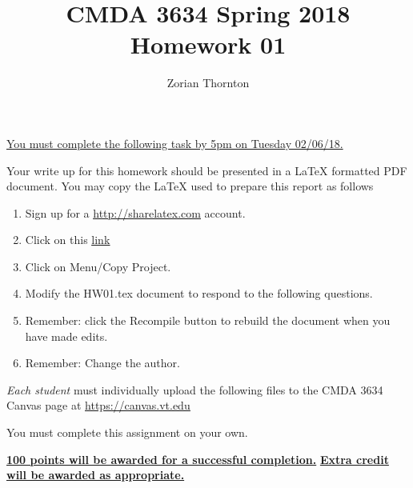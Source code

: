 \documentclass{article}
\newcommand{\pad}{\vspace{8pt}\noindent}
\newcommand{\myhref}[2]{\href{#1}{\color{foo}\underline{#2}\color{black}}}
\begin{document}
\title{CMDA 3634 Spring 2018 Homework 01}

\author{Zorian Thornton}
\vspace{-64pt}\maketitle
\begin{center}\underline{You must complete the following task by 5pm on Tuesday 02/06/18.}\end{center}
Your write up for this homework should be presented in a {\LaTeX} formatted PDF document. You may copy the \LaTeX{} used to prepare this report as follows

\begin{enumerate}
\item Sign up for a \myhref{http://sharelatex.com}{http://sharelatex.com} account.
\item Click on this  \myhref{https://www.sharelatex.com/read/jgjxnrcskhbc}{link} 
\item Click on Menu/Copy Project.
\item Modify the HW01.tex document to respond to the following questions. 
\item Remember: click the Recompile button to rebuild the document when you have made edits.
\item Remember: Change the author. 

\end{enumerate}

\pad \emph{Each student} must individually upload the following files to the CMDA 3634 Canvas page at \myhref{https://canvas.vt.edu}{https://canvas.vt.edu}


\pad You must complete this assignment on your own.

\vspace{16pt}
\begin{center}
\underline{\bf 100 points will be awarded for a successful completion.}
\vspace{8pt}\underline{\bf Extra credit will be awarded as appropriate.}
\end{center}
\end{document}
